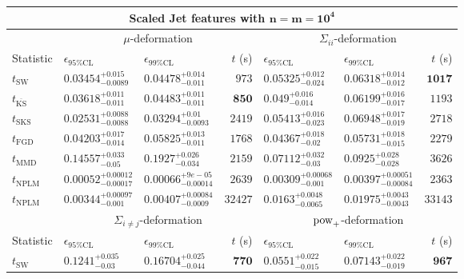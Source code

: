 \begin{tabular}{l|llr|llr}
	\toprule
	\multicolumn{7}{c}{{\bf Scaled Jet features with $\mathbf{n=m=10^{4}}$}} \\
	\toprule
	\multicolumn{1}{c}{} & \multicolumn{3}{c}{$\mu$-deformation} & \multicolumn{3}{c}{$\Sigma_{ii}$-deformation} \\
	Statistic & $\epsilon_{95\%\mathrm{CL}}$ & $\epsilon_{99\%\mathrm    {CL}}$ & $t$ (s) & $\epsilon_{95\%\mathrm{CL}}$ & $\epsilon_{99\%\mathrm{CL}}$ & $t$ (s) \\
	\midrule
	$t_{\mathrm{SW}}$ & $0.03454_{-0.0089}^{+0.015}$ & $0.04478_{-0.011}^{+0.014}$ & $973$ & $0.05325_{-0.024}^{+0.012}$ & $0.06318_{-0.012}^{+0.014}$ & ${\mathbf{1017}}$ \\
	$t_{\overline{\mathrm{KS}}}$ & $0.03618_{-0.011}^{+0.011}$ & $0.04483_{-0.011}^{+0.011}$ & ${\mathbf{850}}$ & $0.049_{-0.014}^{+0.016}$ & $0.06199_{-0.017}^{+0.016}$ & $1193$ \\
	$t_{\mathrm{SKS}}$ & ${\mathbf{0.02531_{-0.0088}^{+0.0088}}}$ & ${\mathbf{0.03294_{-0.0093}^{+0.01}}}$ & $2419$ & $0.05413_{-0.023}^{+0.016}$ & $0.06948_{-0.019}^{+0.017}$ & $2718$ \\
	$t_{\mathrm{FGD}}$ & $0.04203_{-0.014}^{+0.017}$ & $0.05825_{-0.011}^{+0.013}$ & $1768$ & ${\mathbf{0.04367_{-0.02}^{+0.018}}}$ & ${\mathbf{0.05731_{-0.015}^{+0.018}}}$ & $2279$ \\
	$t_{\mathrm{MMD}}$ & $0.14557_{-0.05}^{+0.033}$ & $0.1927_{-0.034}^{+0.026}$ & $2159$ & $0.07112_{-0.03}^{+0.032}$ & $0.0925_{-0.028}^{+0.028}$ & $3626$ \\
\rowcolor{red!35}	$t_{\mathrm{NPLM}}$ & $0.00052_{-0.00017}^{+0.00012}$ & $0.00066_{-0.00014}^{+9e-05}$ & $2639$ & $0.00309_{-0.001}^{+0.00068}$ & $0.00397_{-0.00084}^{+0.00051}$ & $2363$ \\
\rowcolor{blue!35}	$t_{\mathrm{NPLM}}$ & $0.00344_{-0.001}^{+0.00097}$ & $0.00407_{-0.0009}^{+0.00084}$ & $32427$ & $0.0163_{-0.0065}^{+0.0048}$ & $0.01975_{-0.0043}^{+0.0043}$ & $33143$ \\
	\toprule
	\multicolumn{1}{c}{} & \multicolumn{3}{c}{$\Sigma_{i\neq j}$-deformation} & \multicolumn{3}{c}{$\rm{pow}_{+}$-deformation} \\
Statistic & $\epsilon_{95\%\mathrm{CL}}$ & $\epsilon_{99\%\mathrm{CL}}$ & $t$ (s) & $\epsilon_{95\%\mathrm{CL}}$ & $\epsilon_{99\%\mathrm{CL}}$ & $t$ (s) \\
	\midrule
	$t_{\mathrm{SW}}$ & $0.1241_{-0.03}^{+0.035}$ & $0.16704_{-0.044}^{+0.025}$ & ${\mathbf{770}}$ & $0.0551_{-0.015}^{+0.022}$ & $0.07143_{-0.019}^{+0.022}$ & ${\mathbf{967}}$ \\

\end{tabular}
